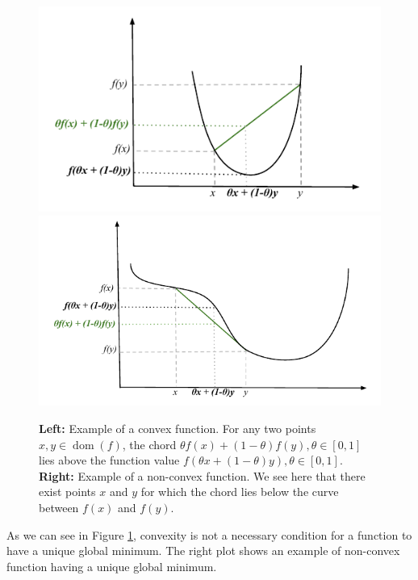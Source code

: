 \documentclass{article}
\DeclareMathOperator*{\dom}{dom}
\begin{document}
\begin{figure}[ht]
\centering
    \includegraphics[height=0.2\textheight]{figures/convex.pdf}
    \includegraphics[height=0.2\textheight]{figures/quasi-convex.pdf}
    \caption[]{\textbf{Left:} Example of a convex function. For any two points $x,y \in \dom(f)$, the chord $\theta f(x) + (1-\theta)f(y), \theta \in [0,1]$ lies above the function value $f(\theta x+ (1-\theta)y), \theta \in [0,1]$. \textbf{Right:} Example of a non-convex function\footnotemark[2]. We see here that there exist points $x$ and $y$ for which the chord lies below the curve between $f(x)$ and $f(y)$.}
    \label{fig:convex}
\end{figure}

As we can see in Figure \ref{fig:convex}, convexity is not a necessary condition for a function to have a unique global minimum.
The right plot shows an example of non-convex function having a unique global minimum.
\end{document}
